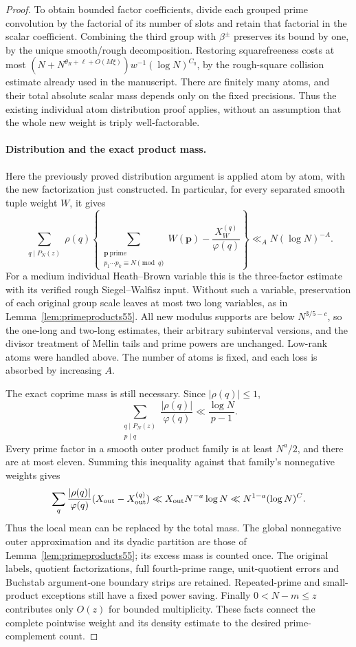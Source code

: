 \documentclass[11pt]{article}
\begin{document}
\begin{proof}
To obtain bounded factor coefficients, divide each grouped prime
convolution by the factorial of its number of slots and retain that
factorial in the scalar coefficient. Combining the third group with
$\beta^\pm$ preserves its bound by one, by the unique smooth/rough
decomposition. Restoring squarefreeness costs at most
$(N+N^{\theta_R+\ell+O(M\xi)})w^{-1}(\log N)^{C_\eta}$,
by the rough-square collision estimate already used in the manuscript.
There are finitely many atoms, and their total absolute scalar mass
depends only on the fixed precisions. Thus the existing individual
atom distribution proof applies, without an assumption that the
whole new weight is triply well-factorable.

\paragraph{Distribution and the exact product mass.}
Here the previously proved distribution argument is applied atom by
atom, with the new factorization just constructed. In particular,
for every separated smooth tuple weight $W$, it gives
\[
 \sum_{\substack{q\mid P_N(z)}}\rho(q)
 \left\{\sum_{\substack{\boldsymbol p\ \mathrm{prime}\\
               p_1\cdots p_k\equiv N\pmod q}}W(\boldsymbol p)
       -\frac{X_W^{(q)}}{\varphi(q)}\right\}
 \ll_A N(\log N)^{-A}.
\]
For a medium individual Heath--Brown variable this is the
three-factor estimate with its verified rough Siegel--Walfisz input.
Without such a variable, preservation of each original group scale
leaves at most two long variables, as in
Lemma~\ref{lem:primeproducts55}. All new modulus supports are below
$N^{3/5-c}$, so the one-long and two-long estimates, their arbitrary
subinterval versions, and the divisor treatment of Mellin tails and
prime powers are unchanged. Low-rank atoms were handled above.
The number of atoms is fixed, and each loss is absorbed by increasing $A$.

The exact coprime mass is still necessary. Since $|\rho(q)|\le1$,
\[
 \sum_{\substack{q\mid P_N(z)\\p\mid q}}
       \frac{|\rho(q)|}{\varphi(q)}
 \ll\frac{\log N}{p-1}.
\]
Every prime factor in a smooth outer product family is at least
$N^a/2$, and there are at most eleven. Summing this inequality
against that family's nonnegative weights gives
\[
 \sum_q\frac{|\rho(q)|}{\varphi(q)}
              (X_{\rm out}-X_{\rm out}^{(q)})
 \ll X_{\rm out}N^{-a}\log N
 \ll N^{1-a}(\log N)^C.
\]
Thus the local mean can be replaced by the total mass. The global
nonnegative outer approximation and its dyadic partition are those
of Lemma~\ref{lem:primeproducts55}; its excess mass is counted once.
The original labels, quotient factorizations, full fourth-prime range,
unit-quotient errors and Buchstab argument-one boundary strips are
retained. Repeated-prime and small-product exceptions still have a
fixed power saving. Finally $0<N-m\le z$ contributes only $O(z)$
for bounded multiplicity. These facts connect the complete pointwise
weight and its density estimate to the desired prime-complement count.


\end{proof}
\end{document}
